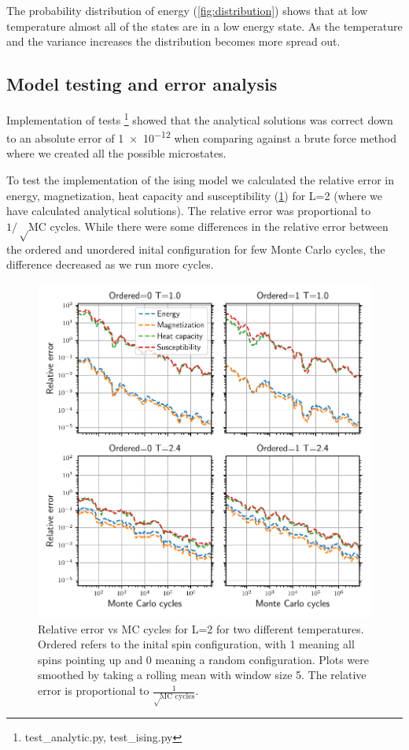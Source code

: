 The probability distribution of energy (\cref{fig:distribution}) shows that
at low temperature almost all of the states are in a low energy state.
As the temperature and the variance increases the distribution becomes more
spread out.


\subsection{Model testing and error analysis}

Implementation of tests \footnote{test\_analytic.py, test\_ising.py} showed that the
analytical solutions was correct down to an absolute error of \num{1e-12}  when
comparing against a brute force method where we created all the possible
microstates.


To test the implementation of the ising model we calculated the relative error
in energy, magnetization, heat capacity and susceptibility (\cref{fig:error_L2})
for L=2 (where we have calculated analytical solutions). The relative error
was proportional to $1/ \sqrt \text{MC cycles}$. While there were some
differences in the relative error between the ordered and unordered inital
configuration for few Monte Carlo cycles, the difference decreased as we run more
cycles.

\begin{figure}[htp]
  \centering
  \includegraphics[width=\textwidth]{../figures/relative_error.pdf}
  \caption{Relative error vs MC cycles for L=2 for two different temperatures. Ordered
  refers to the inital spin configuration, with 1 meaning all spins pointing up and
  0 meaning a random configuration. Plots were smoothed by taking a
  rolling mean with window size 5. The relative error is proportional to
  $\frac{1}{\sqrt \text{MC cycles}}$.}
  \label{fig:error_L2}
\end{figure}


